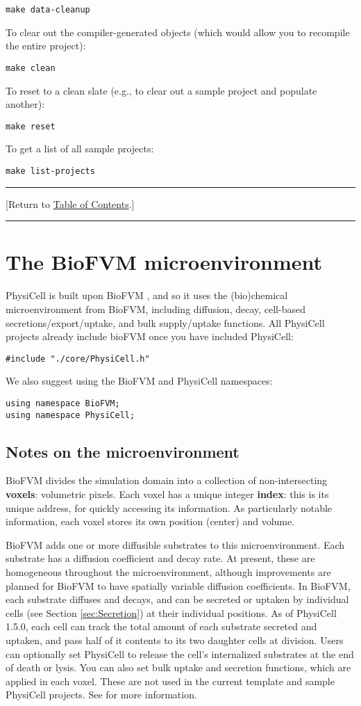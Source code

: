 \documentclass[12pt]{article}
\renewcommand{\v}{\verb}
\newcommand{\TOClink}{\begin{center}\hrule\vskip-5pt\phantom{.}\hfill[Return to \hyperlink{TOC}{Table of Contents}.]\hfill\phantom{.}\vskip3pt\hrule\end{center}}
\begin{document}
\v|make data-cleanup|

To clear out the compiler-generated objects (which would allow you to recompile the entire project): 

\v|make clean| 

To reset to a clean slate (e.g., to clear out a sample project and populate another): 

\v|make reset|

To get a list of all sample projects: 

\v|make list-projects|

\TOClink 

\section{The BioFVM microenvironment}
\label{sec:BioFVM}
PhysiCell is built upon BioFVM \cite{ref:BioFVM}, and so it uses the (bio)chemical microenvironment from BioFVM, 
including diffusion, decay, cell-based secretions/export/uptake, and bulk supply/uptake functions. All 
PhysiCell projects already include bioFVM once you have included PhysiCell: 

\v|#include "./core/PhysiCell.h"|

We also suggest using the BioFVM and PhysiCell namespaces: 

\begin{verbatim}
using namespace BioFVM;
using namespace PhysiCell;
\end{verbatim}

\subsection{Notes on the microenvironment}
\label{sec:about_BioFVM_microenvironment}
BioFVM divides the simulation domain into a collection of non-intersecting \textbf{voxels}: volumetric 
pixels. Each voxel has a unique integer \textbf{index}: this is its unique address, 
for quickly accessing its information. As particularly notable information, each 
voxel stores its own position (center) and volume. 

BioFVM adds one or more diffusible substrates to this microenvironment. Each substrate has a 
diffusion coefficient and decay rate. At present, these are homogeneous throughout the microenvironment, 
although improvements are planned for BioFVM to have spatially variable diffusion coefficients. In 
BioFVM, each substrate diffuses and decays, and can be secreted or uptaken by individual 
cells (see Section \ref{sec:Secretion}) at their individual positions.  
As of PhysiCell 1.5.0, each cell can track the total amount of each substrate secreted and uptaken, and 
pass half of it contents to its two daughter cells at division. Users can optionally set PhysiCell 
to release the cell's internalized substrates at the end of death or lysis. 
You can also set bulk uptake and secretion 
functions, which are applied in each voxel. These are not used in the current template and sample 
PhysiCell projects. See \cite{ref:BioFVM} for more information. 
\end{document}
